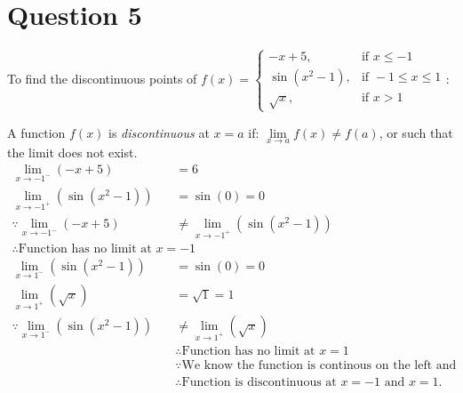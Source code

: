 \documentclass{article}
\begin{document}
\section*{Question 5}
To find the discontinuous points of $f(x)=\begin{cases}
        -x+5,        & \text{if } x\le -1          \\
        \sin(x^2-1), & \text{if } -1 \leq x \leq 1 \\
        \sqrt{x},    & \text{if } x > 1
    \end{cases}$:

A function $f(x)$ is \emph{discontinuous} at $x=a$ if: $\mathop {\lim }\limits_{x \to a} f( x) \ne f( a)$, or such that the limit does not exist.
\begin{align*}
    \lim_{x\to -1^-}(-x+5)                & = 6                                                                                                       \\
    \lim_{x\to -1^+}(\sin(x^2-1))         & = \sin(0) = 0                                                                                             \\
    \because \lim_{x\to -1^-}(-x+5)       & \neq \lim_{x\to -1^+}(\sin(x^2-1))                                                                        \\
    \therefore \text{Function has no limit at } x=-1                                                                                                  \\
    \lim_{x\to 1^-}(\sin(x^2-1))          & = \sin(0) = 0                                                                                             \\
    \lim_{x\to 1^+}(\sqrt{x})             & = \sqrt{1} = 1                                                                                            \\
    \because \lim_{x\to 1^-}(\sin(x^2-1)) & \neq \lim_{x\to 1^+}(\sqrt{x})                                                                            \\
                                          & \therefore \text{Function has no limit at } x= 1                                                          \\
                                          & \because \text{We know the function is continous on the left and right by their functions in the domain.} \\
                                          & \therefore \text{Function is discontinuous at } x=-1 \text{ and } x=1.
\end{align*}
\end{document}
